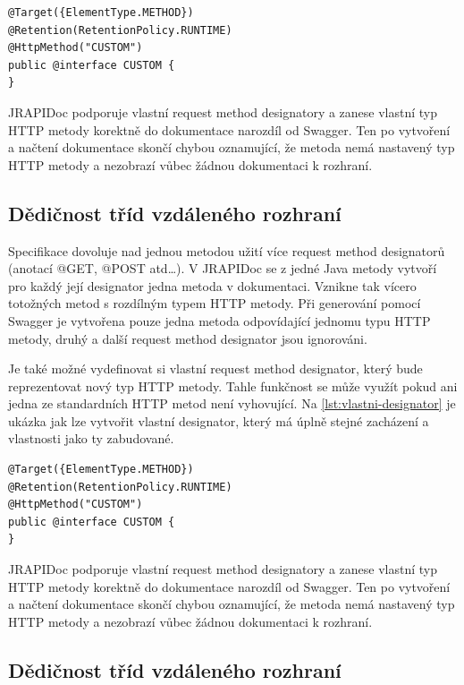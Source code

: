 \documentclass[11pt,twoside,a4paper]{book}
\begin{document}
\begin{lstlisting}[frame=single, caption={Vlastní request method
designator},label={lst:vlastni-designator}] 
@Target({ElementType.METHOD})
@Retention(RetentionPolicy.RUNTIME)
@HttpMethod("CUSTOM")
public @interface CUSTOM {
}
\end{lstlisting}

JRAPIDoc podporuje vlastní request method designatory a zanese vlastní typ HTTP
metody korektně do dokumentace narozdíl od Swagger. Ten po vytvoření a načtení
dokumentace skončí chybou oznamující, že metoda nemá nastavený typ HTTP metody a
nezobrazí vůbec žádnou dokumentaci k rozhraní.

\subsection{Dědičnost tříd vzdáleného rozhraní}

Specifikace dovoluje nad jednou metodou užití více request method designatorů
(anotací @GET, @POST atd\ldots). V JRAPIDoc se z jedné Java metody
vytvoří pro každý její designator jedna metoda v dokumentaci. Vznikne tak vícero
totožných metod s rozdílným typem HTTP metody. Při generování pomocí Swagger je
vytvořena pouze jedna metoda odpovídající jednomu typu HTTP metody, druhý a další 
request method designator jsou ignorováni.

Je také možné vydefinovat si vlastní request method designator, který bude
reprezentovat nový typ HTTP metody. Tahle funkčnost se může využít pokud ani
jedna ze standardních HTTP metod není vyhovující. Na \ref{lst:vlastni-designator} je ukázka jak
lze vytvořit vlastní designator, který má úplně stejné zacházení a vlastnosti
jako ty zabudované. 

\begin{lstlisting}[frame=single, caption={Vlastní request method
designator},label={lst:vlastni-designator}] 
@Target({ElementType.METHOD})
@Retention(RetentionPolicy.RUNTIME)
@HttpMethod("CUSTOM")
public @interface CUSTOM {
}
\end{lstlisting}

JRAPIDoc podporuje vlastní request method designatory a zanese vlastní typ HTTP
metody korektně do dokumentace narozdíl od Swagger. Ten po vytvoření a načtení
dokumentace skončí chybou oznamující, že metoda nemá nastavený typ HTTP metody a
nezobrazí vůbec žádnou dokumentaci k rozhraní.

\subsection{Dědičnost tříd vzdáleného rozhraní}
\end{document}
